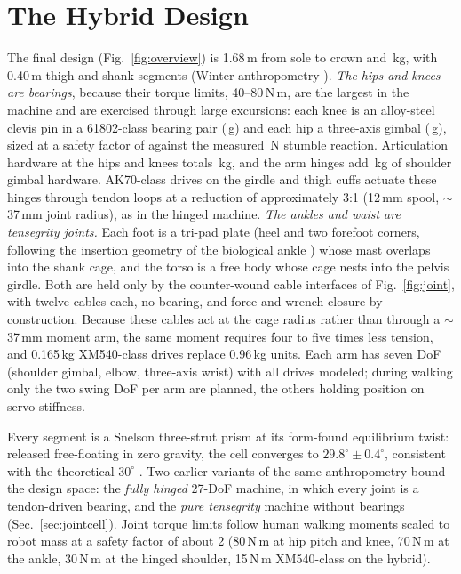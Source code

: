 \documentclass[letterpaper, 10pt, conference]{ieeeconf}
\begin{document}
\section{The Hybrid Design}
\label{sec:design}
The final design (Fig.~\ref{fig:overview}) is 1.68\,m from sole to crown
and \hybridMass\,kg, with 0.40\,m thigh and shank segments (Winter
anthropometry \cite{winter2009biomechanics}). \emph{The hips and knees are
bearings}, because their torque limits, 40--80\,N\,m, are the largest in the
machine and are exercised through large excursions: each knee is an alloy-steel clevis pin in a 61802-class bearing
pair (\hybridKneeHw\,g) and each hip a three-axis gimbal (\hybridHipHw\,g),
sized at a safety factor of \kneeBearingSF{} against the measured
\grfStumble\,N stumble reaction. Articulation hardware at the hips and
knees totals \hybridJointHw\,kg, and the arm hinges add \mbShoulderhw\,kg
of shoulder gimbal hardware. AK70-class drives on the girdle and thigh
cuffs actuate these hinges through tendon loops at a reduction of
approximately 3:1 (12\,mm spool, $\sim$37\,mm joint radius), as in the
hinged machine. \emph{The ankles and waist are tensegrity joints.} Each
foot is a tri-pad plate (heel and two forefoot corners, following the
insertion geometry of the biological ankle \cite{scarr2014biotensegrity})
whose mast overlaps into the shank cage, and the torso is a free body
whose cage nests into the pelvis girdle. Both are held only by the
counter-wound cable interfaces of Fig.~\ref{fig:joint}, with twelve cables
each, no bearing, and force and wrench closure by construction. Because
these cables act at the cage radius rather than through a $\sim$37\,mm
moment arm, the same moment requires four to five times less tension, and
0.165\,kg XM540-class drives replace 0.96\,kg units. Each arm has seven DoF (shoulder gimbal, elbow, three-axis wrist) with
all drives modeled; during walking only the two swing DoF per arm are
planned, the others holding position on servo stiffness.

Every segment is a Snelson three-strut prism at its form-found
equilibrium twist: released free-floating in zero gravity, the cell
converges to $29.8^\circ\pm0.4^\circ$, consistent with the theoretical
$30^\circ$ \cite{tibert2003form}. Two earlier variants of the same
anthropometry bound the design space: the \emph{fully hinged} 27-DoF
machine, in which every joint is a tendon-driven bearing, and the
\emph{pure tensegrity} machine without bearings
(Sec.~\ref{sec:jointcell}). Joint torque limits follow human walking moments scaled to robot mass
at a safety factor of about 2 (80\,N\,m at hip pitch and knee, 70\,N\,m
at the ankle, 30\,N\,m at the hinged shoulder, 15\,N\,m XM540-class on the
hybrid).
\end{document}

